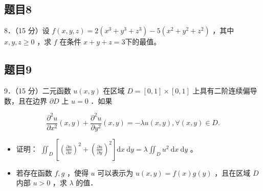 \documentclass{article}
\begin{document}
\subsection{题目8}
8．（15 分）设 \(f(x, y, z)=2\left(x^{3}+y^{3}+z^{3}\right)-5\left(x^{2}+y^{2}+z^{2}\right)\) ，其中 \(x, y, z \geq 0\) ，求 \(f\) 在条件 \(x+y+z=3\)下的最值。

\subsection{题目9}
9．（15 分）二元函数 \(u(x, y)\) 在区域 \(D=[0,1] \times[0,1]\) 上具有二阶连续偏导数，且在边界 \(\partial D\) 上 \(u=0\) ．如果

\[
\frac{\partial^{2} u}{\partial x^{2}}(x, y)+\frac{\partial^{2} u}{\partial y^{2}}(x, y)=-\lambda u(x, y), \forall(x, y) \in D .
\]

\begin{itemize}
  \item[（1）] 证明： \(\iint_{D}\left[\left(\frac{\partial u}{\partial x}\right)^{2}+\left(\frac{\partial u}{\partial y}\right)^{2}\right] \mathrm{d} x \mathrm{~d} y=\lambda \iint_{D} u^{2} \mathrm{~d} x \mathrm{~d} y\) 。
  \item[（2）] 若存在函数 \(f, g\) ，使得 \(u\) 可以表示为 \(u(x, y)=f(x) g(y)\) ，且在区域 \(D\) 内部 \(u>0\) ，求 \(\lambda\) 的值．
\end{itemize}
\end{document}
